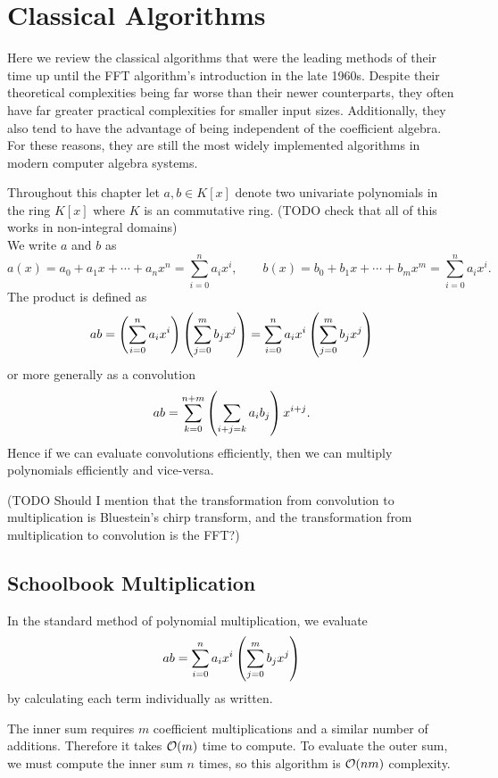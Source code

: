 \chapter{Classical Algorithms}\label{chp:classical}

Here we review the classical algorithms that were the leading methods of their time up until the FFT algorithm's introduction in the late 1960s. Despite their theoretical complexities being far worse than their newer counterparts, they often have far greater practical complexities for smaller input sizes. Additionally, they also tend to have the advantage of being independent of the coefficient algebra. For these reasons, they are still the most widely implemented algorithms in modern computer algebra systems.

Throughout this chapter let $a, b \in K[x]$ denote two univariate polynomials in the ring $K[x]$ where $K$ is an commutative ring. (TODO check that all of this works in non-integral domains)\\
We write $a$ and $b$ as
\[
    a(x) = a_0 + a_1x + \cdots + a_nx^n = \sum^n_{i=0} a_ix^i, \qquad b(x) = b_0 + b_1x + \cdots + b_mx^m = \sum^n_{i=0} a_ix^i.
\]
The product is defined as
\[
    ab = \left(\sum^n_{i=0} a_i x^i\right)\left(\sum^m_{j=0} b_j x^j\right) = \sum^n_{i=0} a_ix^i\left(\sum^m_{j=0} b_j x^j\right)
\]
or more generally as a convolution
\[
    ab = \sum^{n + m}_{k=0} \left(\sum_{i + j = k}a_ib_j\right) x^{i + j}.
\]
Hence if we can evaluate convolutions efficiently, then we can multiply polynomials efficiently and vice-versa.

(TODO Should I mention that the transformation from convolution to multiplication is Bluestein's chirp transform, and the transformation from multiplication to convolution is the FFT?)

\section{Schoolbook Multiplication}
\label{sec:prelim-schoolbook}

In the standard method of polynomial multiplication, we evaluate
\[
    ab = \sum^n_{i=0} a_ix^i\left(\sum^m_{j=0} b_j x^j\right)
\]
by calculating each term individually as written.

The inner sum requires $m$ coefficient multiplications and a similar number of additions. Therefore it takes $\mathcal O(m)$ time to compute. To evaluate the outer sum, we must compute the inner sum $n$ times, so this algorithm is $\mathcal O(nm)$ complexity.

